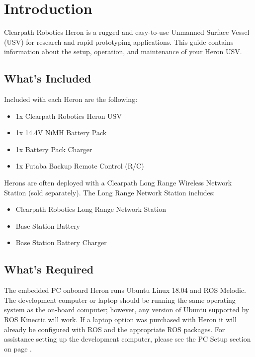 \documentclass[]{clearpath-latex/clearpath-manual}
\begin{document}
\tableofcontents

\section{Introduction}
Clearpath Robotics Heron is a rugged and easy-to-use Unmanned Surface Vessel (USV) for research and rapid prototyping applications. This guide contains information about the setup, operation, and maintenance of your Heron USV.

\subsection{What's Included}

Included with each Heron are the following:

\begin{itemize}[nolistsep]
	\item 1x Clearpath Robotics Heron USV
	\item 1x 14.4V NiMH Battery Pack
	\item 1x Battery Pack Charger
	\item 1x Futaba Backup Remote Control (R/C)
\end{itemize}

Herons are often deployed with a Clearpath Long Range Wireless Network Station (sold separately). The Long Range Network Station includes:

\begin{itemize}[nolistsep]
	\item Clearpath Robotics Long Range Network Station
	\item Base Station Battery
	\item Base Station Battery Charger
\end{itemize}

\subsection{What's Required}

The embedded PC onboard Heron runs Ubuntu Linux 18.04 and ROS Melodic. The development computer or laptop should be running the same operating system as the on-board computer; however, any version of Ubuntu supported by ROS Kinectic will work. If a laptop option was purchased with Heron it will already be configured with ROS and the appropriate ROS packages. For assistance setting up the development computer, please see the PC Setup section on page \pageref{pcsetup}.
\end{document}
